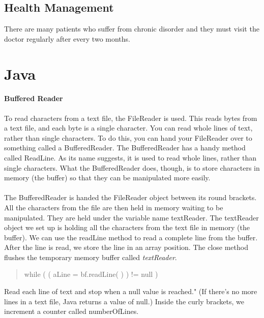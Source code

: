 \documentclass{article}
\begin{document}
\begin{multicols}{2}
\subsection{Health Management}
There are many patients who suffer from chronic disorder and they must visit the doctor regularly after every two months.

\end{multicols}


\section{Java}
\paragraph{Buffered Reader}
To read characters from a text file, the FileReader is used. This reads bytes from a text file, and each byte is a single character. You can read whole lines of text, rather than single characters. To do this, you can hand your FileReader over to something called a BufferedReader. The BufferedReader has a handy method called ReadLine. As its name suggests, it is used to read whole lines, rather than single characters. What the BufferedReader does, though, is to store characters in memory (the buffer) so that they can be manipulated more easily.

\paragraph{} The BufferedReader is handed the FileReader object between its round brackets. All the characters from the file are then held in memory waiting to be manipulated. They are held under the variable name textReader.
The textReader object we set up is holding all the characters from the text file in memory (the buffer). We can use the readLine method to read a complete line from the buffer. After the line is read, we store the line in an array position.
The close method flushes the temporary memory buffer called \textit{textReader}. 

\begin{quotation}
while ( ( aLine = bf.readLine( ) ) != null )
\end{quotation}
Read each line of text and stop when a null value is reached." (If there's no more lines in a text file, Java returns a value of null.) Inside the curly brackets, we increment a counter called numberOfLines.
\end{document}
